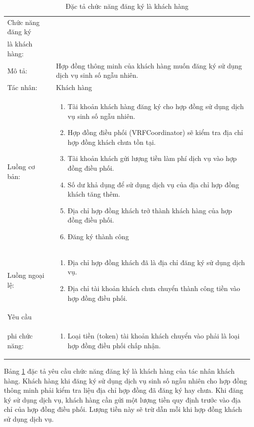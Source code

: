 \documentclass[../main.tex]{subfiles}
\begin{document}
\begin{table}[H]
\begin{tabularx}{\textwidth}{|l|X|}
Chức năng đăng ký\\ là khách hàng:  &  \\
Mô tả:                  &Hợp đồng thông minh của khách hàng muốn đăng ký sử dụng dịch vụ sinh số ngẫu nhiên.\\
Tác nhân:               & Khách hàng \\
Luồng cơ bản:           &
\begin{enumerate}
    \item Tài khoản khách hàng đăng ký cho hợp đồng sử dụng dịch vụ sinh số ngẫu nhiên.
    \item Hợp đồng điều phối (VRFCoordinator) sẽ kiểm tra địa chỉ hợp đồng khách chưa tồn tại.
    \item Tài khoản khách gửi lượng tiền làm phí dịch vụ vào hợp đồng điều phối.
    \item Số dư khả dụng để sử dụng dịch vụ của địa chỉ hợp đồng khách tăng thêm.
    \item Địa chỉ hợp đồng khách trở thành khách hàng của hợp đồng điều phối.
    \item Đăng ký thành công
\end{enumerate}\\
Luồng ngoại lệ:         &
\begin{enumerate}
    \item Địa chỉ hợp đồng khách đã là địa chỉ đăng ký sử dụng dịch vụ.
    \item Địa chỉ tài khoản khách chưa chuyển thành công tiền vào hợp đồng điều phối.
\end{enumerate}\\
Yêu cầu                 &\\
phi chức năng:           & 
\begin{enumerate}
    \item Loại tiền (token) tài khoản khách chuyển vào phải là loại hợp đồng điều phối chấp nhận.
\end{enumerate}\\

\end{tabularx}
\caption{Đặc tả chức năng đăng ký là khách hàng}
\label{table: 2}
\end{table}
Bảng \ref{table: 2} đặc tả yêu cầu chức năng đăng ký là khách hàng của tác nhân khách hàng. Khách hàng khi đăng ký sử dụng dịch vụ sinh số ngẫu nhiên cho hợp đồng thông minh phải kiểm tra liệu địa chỉ hợp đồng đã đăng ký hay chưa. Khi đăng ký sử dụng dịch vụ, khách hàng cần gửi một lượng tiền quy định trước vào địa chỉ của hợp đồng điều phối. Lượng tiền này sẽ trừ dẫn mỗi khi hợp đồng khách sử dụng dịch vụ.
\end{document}
